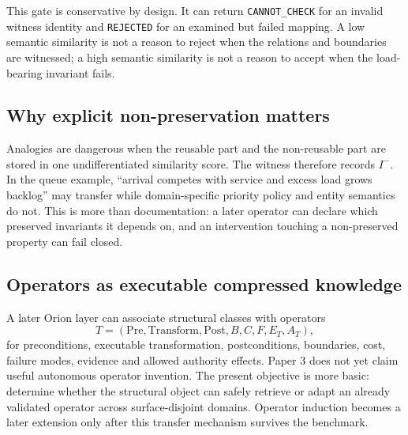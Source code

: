 This gate is conservative by design. It can return \texttt{CANNOT\_CHECK} for an invalid witness identity and \texttt{REJECTED} for an examined but failed mapping. A low semantic similarity is not a reason to reject when the relations and boundaries are witnessed; a high semantic similarity is not a reason to accept when the load-bearing invariant fails.

\subsection{Why explicit non-preservation matters}

Analogies are dangerous when the reusable part and the non-reusable part are stored in one undifferentiated similarity score. The witness therefore records $I^-$. In the queue example, ``arrival competes with service and excess load grows backlog'' may transfer while domain-specific priority policy and entity semantics do not. This is more than documentation: a later operator can declare which preserved invariants it depends on, and an intervention touching a non-preserved property can fail closed.

\subsection{Operators as executable compressed knowledge}

A later Orion layer can associate structural classes with operators
\[
T=(\mathrm{Pre},\mathrm{Transform},\mathrm{Post},B,C,F,E_T,A_T),
\]
for preconditions, executable transformation, postconditions, boundaries, cost, failure modes, evidence and allowed authority effects. Paper 3 does not yet claim useful autonomous operator invention. The present objective is more basic: determine whether the structural object can safely retrieve or adapt an already validated operator across surface-disjoint domains. Operator induction becomes a later extension only after this transfer mechanism survives the benchmark.

